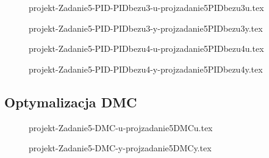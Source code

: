 \begin{figure}[H] 
    \centering
    
    \caption{projekt-Zadanie5-PID-PIDbezu3-u-projzadanie5PIDbezu3u.tex}
    \label{projekt:zad5:figure:projzadanie5PIDbezu3u}
\end{figure}

\begin{figure}[H] 
    \centering
    
    \caption{projekt-Zadanie5-PID-PIDbezu3-y-projzadanie5PIDbezu3y.tex}
    \label{projekt:zad5:figure:projzadanie5PIDbezu3y}
\end{figure}

\begin{figure}[H] 
    \centering
    
    \caption{projekt-Zadanie5-PID-PIDbezu4-u-projzadanie5PIDbezu4u.tex}
    \label{projekt:zad5:figure:projzadanie5PIDbezu4u}
\end{figure}

\begin{figure}[H] 
    \centering
    
    \caption{projekt-Zadanie5-PID-PIDbezu4-y-projzadanie5PIDbezu4y.tex}
    \label{projekt:zad5:figure:projzadanie5PIDbezu4y}
\end{figure}



\subsection{Optymalizacja DMC}

\begin{figure}[H] 
    \centering
    
    \caption{projekt-Zadanie5-DMC-u-projzadanie5DMCu.tex}
    \label{projekt:zad5:figure:projzadanie5DMCu}
\end{figure}

\begin{figure}[H] 
    \centering
    
    \caption{projekt-Zadanie5-DMC-y-projzadanie5DMCy.tex}
    \label{projekt:zad5:figure:projzadanie5DMCy}
\end{figure}



\newpage
